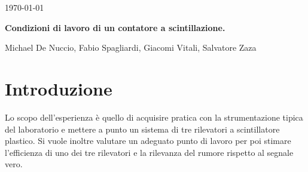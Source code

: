 \documentclass[a4paper,10pt]{article}
\begin{document}
\begin{flushright}             
\today
\end{flushright} 

\begin{center}
\Large{\bf Condizioni di lavoro di un contatore a scintillazione. }

\vspace*{1cm}                                 
\large{Michael De Nuccio, Fabio Spagliardi, Giacomi Vitali, Salvatore Zaza }\\ 
\vspace*{0.5cm}       
\vspace*{1.cm}
\end{center}



\section{Introduzione}
\label{sec:intro} 
Lo scopo dell'esperienza è quello di acquisire pratica con la strumentazione tipica del laboratorio e mettere a punto un sistema di tre rilevatori a scintillatore plastico. Si vuole inoltre valutare un adeguato punto di lavoro per poi stimare l'efficienza di uno dei tre rilevatori e la rilevanza del rumore rispetto al segnale vero.

\end{document}
